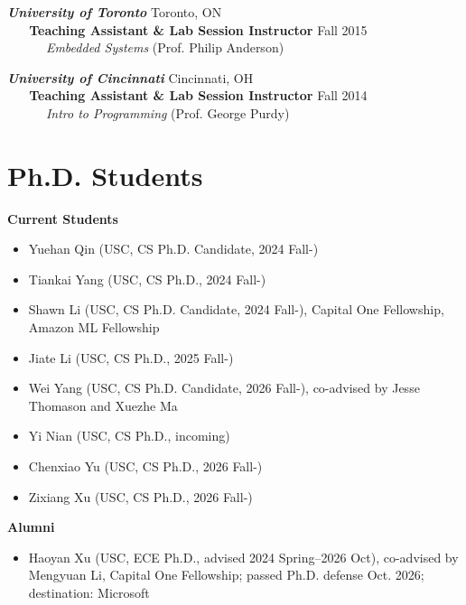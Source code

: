 \documentclass[margin,line,pifont,palatino,courier]{res}
\begin{document}
\begin{resume}
\textit{\textbf{University of Toronto}} \hfill Toronto, ON\\
\-\textbf{~~~Teaching Assistant \& Lab Session Instructor}  \hfill Fall 2015  \\
\-\textit{~~~~~~Embedded Systems} (Prof. Philip Anderson)

\textit{\textbf{University of Cincinnati}} \hfill Cincinnati, OH\\
\-\textbf{~~~Teaching Assistant \& Lab Session Instructor}  \hfill Fall 2014 \\
\-\textit{~~~~~~Intro to Programming} (Prof. George Purdy) 

\section{\sc Ph.D. Students}

\textbf{Current Students}
\begin{itemize}[leftmargin=*]
\setlength\itemsep{-0.1em}

    \item Yuehan Qin (USC, CS Ph.D. Candidate, 2024 Fall-)
    \item Tiankai Yang (USC, CS Ph.D., 2024 Fall-)
    \item Shawn Li (USC, CS Ph.D. Candidate, 2024 Fall-), \textcolor{uscred}{\faAward \xspace Capital One Fellowship, Amazon ML Fellowship}
    \item Jiate Li (USC, CS Ph.D., 2025 Fall-)
    \item Wei Yang (USC, CS Ph.D. Candidate, 2026 Fall-), co-advised by Jesse Thomason and Xuezhe Ma
    \item Yi Nian (USC, CS Ph.D., incoming)
    \item Chenxiao Yu (USC, CS Ph.D., 2026 Fall-)
    \item Zixiang Xu (USC, CS Ph.D., 2026 Fall-)
\end{itemize}

\textbf{Alumni}
\begin{itemize}[leftmargin=*]
\setlength\itemsep{-0.1em}
    \item Haoyan Xu (USC, ECE Ph.D., advised 2024 Spring--2026 Oct), co-advised by Mengyuan Li,
    \textcolor{uscred}{\faAward \xspace Capital One Fellowship}; passed Ph.D. defense Oct. 2026; destination: Microsoft
\end{itemize}


\end{resume}
\end{document}
